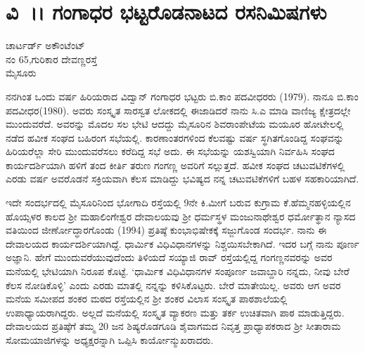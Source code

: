 {\fontsize{14}{16}\selectfont
\chapter{ವಿ~।। ಗಂಗಾಧರ ಭಟ್ಟರೊಡನಾಟದ ರಸನಿಮಿಷಗಳು} 

\begin{center}
\smallskip
ಚಾರ್ಟರ್ಡ್ ಅಕೌಂಟೆಂಟ್\\ 
ನಂ 65,ಗುರಿಕಾರ ದೇವಣ್ಣರಸ್ತೆ\\
ಮೈಸೂರು 
\addrule	
\end{center}

ನನಗಿಂತ ಒಂದು ವರ್ಷ ಹಿರಿಯರಾದ ವಿದ್ವಾನ್ ಗಂಗಾಧರ ಭಟ್ಟರು ಬಿ.ಕಾಂ ಪದವೀಧರರು (1979). ನಾನೂ ಬಿ.ಕಾಂ ಪದವೀಧರ(1980). ಅವರು ಸಂಸ್ಕೃತ ಸಾರಸ್ವತ ಲೋಕದಲ್ಲಿ ಈಜಾಡಿದರೆ ನಾನು ಸಿ.ಎ ಮಾಡಿ ವಾಣಿಜ್ಯ ಕ್ಷೇತ್ರದಲ್ಲೇ ಮುಂದುವರೆದೆ. ಅವರನ್ನು ಮೊದಲ ಸಲ ಭೇಟಿ ಆದದ್ದು ಮೈಸೂರಿನ ಶಿವರಾಂಪೇಟೆಯ ಮಯೂರ ಹೋಟೇಲಲ್ಲಿ ನಡೆದ ಹವೀಕ ಸಂಘದ ಬಹಿರಂಗ ಸಭೆಯಲ್ಲಿ. ಕಾರಣಾಂತರಗಳಿಂದ ಕೆಲವಷ್ಟು ವರ್ಷ ಸ್ಥಗಿತಗೊಂಡಿದ್ದ ಸಂಘವನ್ನು ಹಿರಿಯರೆಲ್ಲಾ ಸೇರಿ ಮುಂದುವರೆಸಲು ಕರೆದಿದ್ದ ಸಭೆ ಅದು. ಈ ಸಭೆಯನ್ನು ಯಶಸ್ವಿಯಾಗಿ ನಿರ್ವಹಿಸಿ ಸಂಘದ ಕಾರ್ಯದರ್ಶಿಯಾಗಿ ಹಳಿಗೆ ತಂದ ಕೀರ್ತಿ ತರುಣ ಗಂಗಣ್ಣ ಅವರಿಗೆ ಸಲ್ಲುತ್ತದೆ. ಹವೀಕ ಸಂಘದ ಚಟುವಟಿಕೆಗಳಲ್ಲಿ ಎರಡು ವರ್ಷ ಅವರೊಡನೆ ಸಕ್ರಿಯವಾಗಿ ಕೆಲಸ ಮಾಡಿದ್ದು ಭವಿಷ್ಯದ ನನ್ನ ಚಟುವಟಿಕೆಗಳಿಗೆ ಬಹಳ ಸಹಕಾರಿಯಾಗಿದೆ.

ಇದೇ ಸಂದರ್ಭದಲ್ಲಿ ಮೈಸೂರಿನಿಂದ ಭೋಗಾದಿ ರಸ್ತೆಯಲ್ಲಿ 9ನೇ ಕಿ.ಮೀಗೆ ಬರುವ ಕುಗ್ರಾಮ ಕೆ.ಹೆಮ್ಮನ\-ಹಳ್ಳಿಯಲ್ಲಿನ ಹೊಯ್ಸಳರ ಕಾಲದ ಶ್ರೀ \hbox{ಮಹಾಲಿಂಗೇಶ್ವರ} ದೇವಾಲಯವು ಶ್ರೀ ಧರ್ಮಸ್ಥಳ ಮಂಜುನಾಥೇಶ್ವರ ಧರ್ಮೋತ್ಥಾನ ನ್ಯಾಸದ \hbox{ವತಿಯಿಂದ} ಜೀರ್ಣೋದ್ಧಾರಗೊಂಡು (1994)    ಪ್ರತಿಷ್ಠೆ  \enginline{-}  ಕುಂಭಾಭಿಷೇಕಕ್ಕೆ \hbox{ಸಜ್ಜುಗೊಂಡ} ಸಂದರ್ಭ. ನಾನು ಈ ದೇವಾಲಯದ ಕಾರ್ಯದರ್ಶಿಯಾಗಿದ್ದೆ. ಧಾರ್ಮಿಕ ವಿಧಿವಿಧಾನ\-ಗಳನ್ನು  ನಿಶ್ಚಯಿಸಬೇಕಾಗಿದೆ. ಇದರ ಬಗ್ಗೆ ನಾನು ಪೂರ್ಣ ಅಜ್ಞಾನಿ. ಹೇಗೆ ಮುಂದುವರೆಯುವುದೆಂದು ತಿಳಿಯದೆ ಸಯ್ಯಾಜಿ ರಾವ್ ರಸ್ತೆಯಲ್ಲಿದ್ದ ಗಂಗಣ್ಣನವರನ್ನು ಅವರ \hbox{ಮನೆಯಲ್ಲಿ} ಭೇಟಿಯಾಗಿ ನಿರೂಪ ಕೊಟ್ಟೆ.  ‘ಧಾರ್ಮಿಕ ವಿಧಿವಿಧಾನಗಳ ಸಂಪೂರ್ಣ  ಜವಾಬ್ದಾರಿ ನನ್ನದು, ನೀವು ಬೇರೆ ಕೆಲಸ ನೋಡಿಕೊಳ್ಳಿ’  ಎಂದು ಎರಡು ಮಾತಲ್ಲಿ ನನ್ನನ್ನು ಕಳಿಸಿಕೊಟ್ಟರು. ಬೇರೆ ಮಾತೇಯಿಲ್ಲ. ಅವರು ಆಗ ಅವರ ಮನೆಯ ಸಮೀಪದ ಶಂಕರ ಮಠದ ರಸ್ತೆಯಲ್ಲಿನ ಶ್ರೀ ಶಂಕರ ವಿಲಾಸ ಸಂಸ್ಕೃತ ಪಾಠಶಾಲೆಯಲ್ಲಿ ಉಪಾಧ್ಯಾಯರಾಗಿದ್ದರು. ಅಲ್ಲದೆ ಮನೆಯಲ್ಲಿ ಸಂಸ್ಕೃತ ವ್ಯಾಕರಣ ಮತ್ತು ತರ್ಕ ಉಚಿತ\-ವಾಗಿ ಪಾಠ ಮಾಡುತ್ತಿದ್ದರು. ದೇವಾಲಯದ ಪ್ರತಿಷ್ಠೆಗೆ ತಮ್ಮ 20 ಜನ ಶಿಷ್ಯರೊಡಗೂಡಿ ಶೈವಾಗಮದ  ನಿವೃತ್ತ ಪ್ರಾಧ್ಯಾಪಕರಾದ ಶ್ರೀ ಸೀತಾರಾಮ ಸೋಮಯಾಜಿಗಳನ್ನು ಅಧ್ಯಕ್ಷ\-ರನ್ನಾಗಿ ಒಪ್ಪಿಸಿ ಕಾರ್ಯೋನ್ಮುಖರಾದರು. 

}
